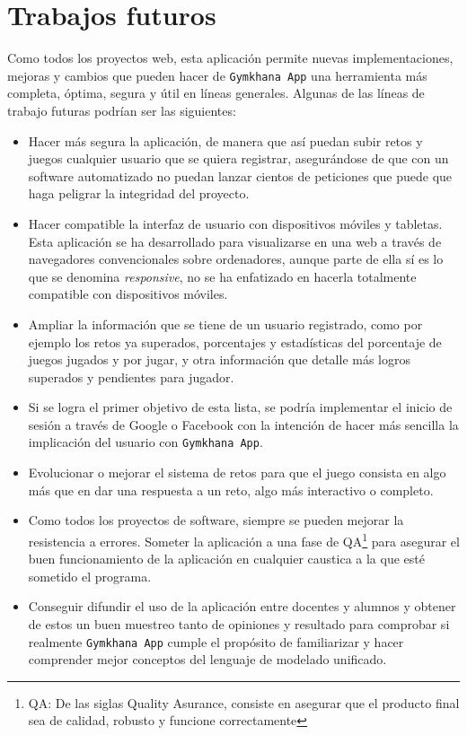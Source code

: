 \documentclass[a4paper, 12pt]{book}
\begin{document}
\section{Trabajos futuros}
\label{sec:trabajos_futuros}
Como todos los proyectos web, esta aplicación permite nuevas implementaciones, mejoras y cambios que pueden hacer de \texttt{Gymkhana App} una herramienta más completa, óptima, segura y útil en líneas generales. Algunas de las líneas de trabajo futuras podrían ser las siguientes: 

\begin{itemize}
	\item Hacer más segura la aplicación, de manera que así puedan subir retos y juegos cualquier usuario que se quiera registrar, asegurándose de que con un software automatizado no puedan lanzar cientos de peticiones que puede que haga peligrar la integridad del proyecto.
	\item Hacer compatible la interfaz de usuario con dispositivos móviles y tabletas. Esta aplicación se ha desarrollado para visualizarse en una web a través de navegadores convencionales sobre ordenadores, aunque parte de ella sí es lo que se denomina \emph{responsive}, no se ha enfatizado en hacerla totalmente compatible con dispositivos móviles. 
	\item Ampliar la información que se tiene de un usuario registrado, como por ejemplo los retos ya superados, porcentajes y estadísticas del porcentaje de juegos jugados y por jugar, y otra información que detalle más logros superados y pendientes para jugador. 
	\item Si se logra el primer objetivo de esta lista, se podría implementar el inicio de sesión a través de Google o Facebook con la intención de hacer más sencilla la implicación del usuario con \texttt{Gymkhana App}. 
	\item Evolucionar o mejorar el sistema de retos para que el juego consista en algo más que en dar una respuesta a un reto, algo más interactivo o completo. 
	\item Como todos los proyectos de software, siempre se pueden mejorar la resistencia a errores. Someter la aplicación a una fase de QA\footnote{QA: De las siglas Quality Asurance, consiste en asegurar que el producto final sea de calidad, robusto y funcione correctamente} para asegurar el buen funcionamiento de la aplicación en cualquier caustica a la que esté sometido el programa.
	\item Conseguir difundir el uso de la aplicación entre docentes y alumnos y obtener de estos un buen muestreo tanto de opiniones y resultado para comprobar si realmente \texttt{Gymkhana App} cumple el propósito de familiarizar y hacer comprender mejor conceptos del lenguaje de modelado unificado. 
	
\end{itemize}
\end{document}
